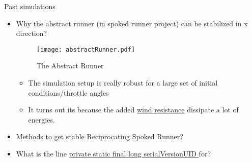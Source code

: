 Past simulations
\begin{itemize}
\item Why the abstract runner (in spoked runner project) can be stabilized in x direction? 
\begin{figure}[h]
\centering

\texttt{[image: abstractRunner.pdf]} 
\caption{The Abstract Runner}
\end{figure}
\begin{itemize}
\item The simulation setup is really robust for a large set of initial conditions/throttle angles
\item It turns out its because the added \underline{wind resistance} dissipate a lot of energies.
\end{itemize}


\item Methods to get stable Reciprocating Spoked Runner?
\item What is the line \underline{private static final long serialVersionUID } for?

\end{itemize}

\pagebreak